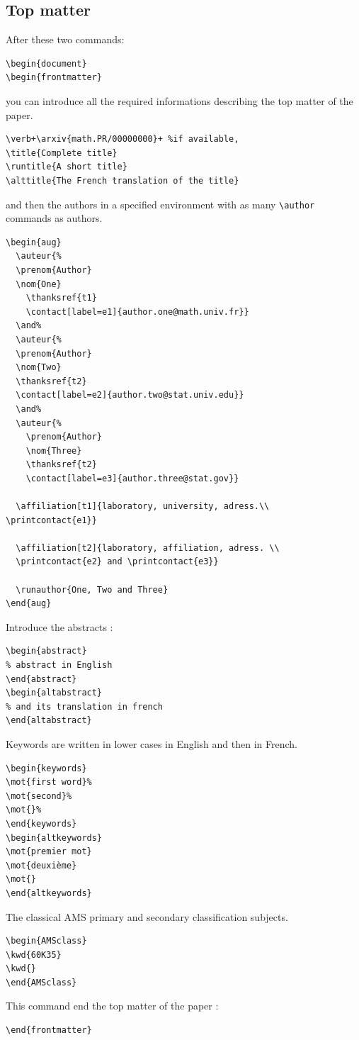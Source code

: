 \documentclass[submission]{jsfds}
\begin{document}
\subsection{Top matter}
After these two commands:
\begin{verbatim}
\begin{document}
\begin{frontmatter}
\end{verbatim}
you can introduce all the required informations describing the top matter of the paper.
\begin{verbatim}
\verb+\arxiv{math.PR/00000000}+ %if available, 
\title{Complete title}
\runtitle{A short title}
\alttitle{The French translation of the title}
\end{verbatim}
and then the authors in a specified environment with as many \verb+\author+ commands as authors.
\begin{verbatim}
\begin{aug}
  \auteur{%
  \prenom{Author}
  \nom{One}
    \thanksref{t1}
    \contact[label=e1]{author.one@math.univ.fr}}
  \and%
  \auteur{%
  \prenom{Author}
  \nom{Two}
  \thanksref{t2}
  \contact[label=e2]{author.two@stat.univ.edu}}
  \and%
  \auteur{%
    \prenom{Author}
    \nom{Three}
    \thanksref{t2}
    \contact[label=e3]{author.three@stat.gov}}
  
  \affiliation[t1]{laboratory, university, adress.\\ \printcontact{e1}}

  \affiliation[t2]{laboratory, affiliation, adress. \\ 
  \printcontact{e2} and \printcontact{e3}} 
  
  \runauthor{One, Two and Three}
\end{aug}
\end{verbatim}
Introduce the abstracts : 
\begin{verbatim}
\begin{abstract}
% abstract in English
\end{abstract}
\begin{altabstract}
% and its translation in french
\end{altabstract}
\end{verbatim}
Keywords are written in lower cases in English and then in French.
\begin{verbatim}
\begin{keywords}
\mot{first word}%
\mot{second}%
\mot{}%
\end{keywords}
\begin{altkeywords}
\mot{premier mot}
\mot{deuxième}
\mot{}
\end{altkeywords}
\end{verbatim}
The classical AMS primary and secondary classification subjects.
\begin{verbatim}
\begin{AMSclass}
\kwd{60K35}
\kwd{}
\end{AMSclass}
\end{verbatim}
This command end the top matter of the paper : 
\begin{verbatim}
\end{frontmatter}
\end{verbatim}
\end{document}
